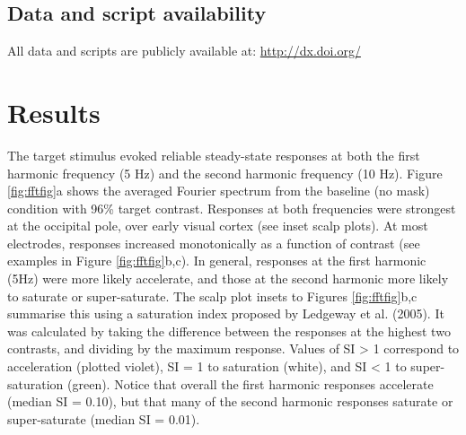 \documentclass[]{article}
\begin{document}
\hypertarget{data-and-script-availability}{%
\subsection{Data and script availability}\label{data-and-script-availability}}

All data and scripts are publicly available at: \url{http://dx.doi.org/}

\hypertarget{results}{%
\section{Results}\label{results}}

The target stimulus evoked reliable steady-state responses at both the first harmonic frequency (5 Hz) and the second harmonic frequency (10 Hz). Figure \ref{fig:fftfig}a shows the averaged Fourier spectrum from the baseline (no mask) condition with 96\% target contrast. Responses at both frequencies were strongest at the occipital pole, over early visual cortex (see inset scalp plots). At most electrodes, responses increased monotonically as a function of contrast (see examples in Figure \ref{fig:fftfig}b,c). In general, responses at the first harmonic (5Hz) were more likely accelerate, and those at the second harmonic more likely to saturate or super-saturate. The scalp plot insets to Figures \ref{fig:fftfig}b,c summarise this using a saturation index proposed by Ledgeway et al. (2005). It was calculated by taking the difference between the responses at the highest two contrasts, and dividing by the maximum response. Values of SI \textgreater{} 1 correspond to acceleration (plotted violet), SI = 1 to saturation (white), and SI \textless{} 1 to super-saturation (green). Notice that overall the first harmonic responses accelerate (median SI = 0.10), but that many of the second harmonic responses saturate or super-saturate (median SI = 0.01).
\end{document}
